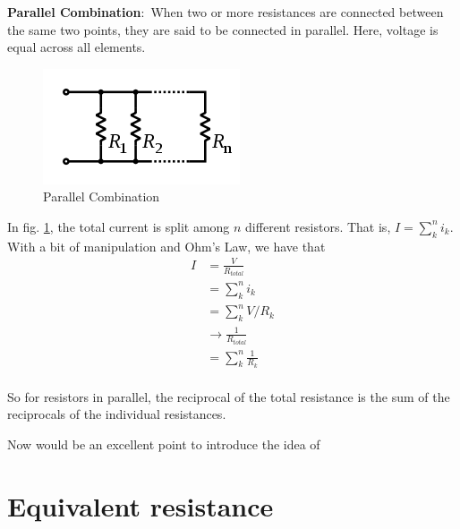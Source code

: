 \documentclass[nobib]{tufte-handout}
\newcommand{\defn}[2]{\noindent\textbf{#1}:\ #2}
\begin{document}
\defn{Parallel Combination}{When two or more resistances are 
connected between the same two points, they are said to be 
connected in parallel. Here, voltage is equal
across all elements}. 
\begin{figure}
    \center
    \includegraphics[width=\textwidth/2]{images/220px-Resistors_in_parallel.svg.png}
    \caption{Parallel Combination}
    \label{fig:parallel}
\end{figure}
In fig. \ref{fig:parallel}, the total current is split among
$n$ different resistors. That is, $I = \sum_k^n i_k$. With a bit of
manipulation and Ohm's Law, we have that
\begin{align*}
    I &= \frac{V}{R_{total}}\\
    &= \sum_k^n i_k \\
    &= \sum_k^n V/R_k \\
    &\rightarrow \frac{1}{R_{total}} \\
    &= \sum_k^n \frac{1}{R_k} \\
\end{align*}

So for resistors in parallel, the reciprocal of the total resistance is 
the sum of the reciprocals of the individual resistances. 

Now would
be an excellent point to introduce the idea of 

\section{Equivalent resistance}
\end{document}
